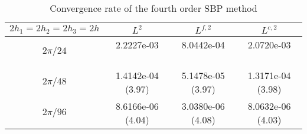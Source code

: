 \begin{table}[htb]
	\begin{center}
		\begin{tabular}{|c|c c c|}
			\hline
			$2h_1 = 2h_2 = 2h_3 = 2h$   & $L^2$ & $L^{f,2}$ & $L^{c,2}$  \\
			\hline
			$2\pi/24$ &2.2227e-03 ~~~~~~~~ & 8.0442e-04 ~~~~~~~~ & 2.0720e-03 ~~~~~~~~\\
			\hline
			$2\pi/48$ &1.4142e-04 (3.97) & 5.1478e-05 (3.97) & 1.3171e-04 (3.98)\\
			\hline 
			$2\pi/96$ &8.6166e-06 (4.04) & 3.0380e-06 (4.08) & 8.0632e-06 (4.03)\\
			\hline
		\end{tabular}
	\end{center}
	\caption{Convergence rate of the fourth order SBP method}\label{convergence_rate}
\end{table} 
